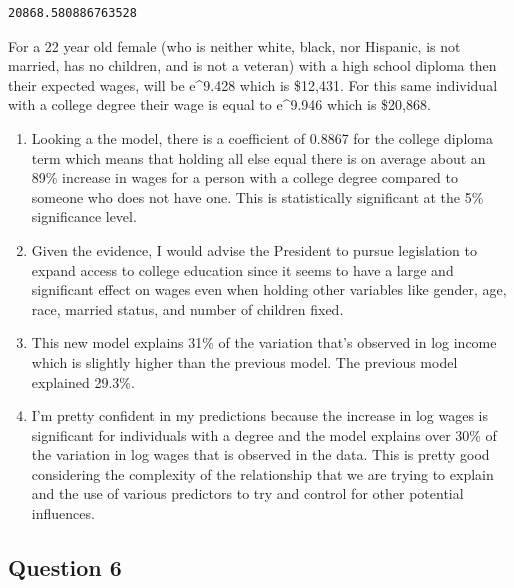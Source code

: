 \documentclass[
  letterpaper,
  DIV=11,
  numbers=noendperiod]{scrartcl}
\begin{document}
\begin{verbatim}
20868.580886763528
\end{verbatim}

For a 22 year old female (who is neither white, black, nor Hispanic, is
not married, has no children, and is not a veteran) with a high school
diploma then their expected wages, will be e\^{}9.428 which is \$12,431.
For this same individual with a college degree their wage is equal to
e\^{}9.946 which is \$20,868.

\begin{enumerate}
\def\labelenumi{\alph{enumi}.}
\setcounter{enumi}{3}
\item
  Looking a the model, there is a coefficient of 0.8867 for the college
  diploma term which means that holding all else equal there is on
  average about an 89\% increase in wages for a person with a college
  degree compared to someone who does not have one. This is
  statistically significant at the 5\% significance level.
\item
  Given the evidence, I would advise the President to pursue legislation
  to expand access to college education since it seems to have a large
  and significant effect on wages even when holding other variables like
  gender, age, race, married status, and number of children fixed.
\item
  This new model explains 31\% of the variation that's observed in log
  income which is slightly higher than the previous model. The previous
  model explained 29.3\%.
\item
  I'm pretty confident in my predictions because the increase in log
  wages is significant for individuals with a degree and the model
  explains over 30\% of the variation in log wages that is observed in
  the data. This is pretty good considering the complexity of the
  relationship that we are trying to explain and the use of various
  predictors to try and control for other potential influences.
\end{enumerate}

\subsection{Question 6}\label{question-6}
\end{document}
